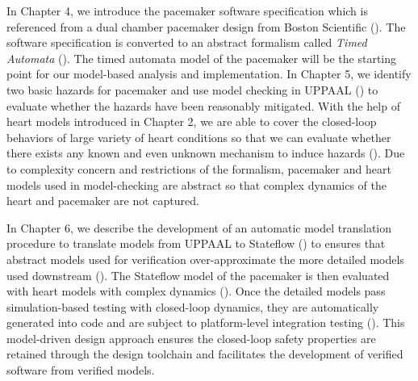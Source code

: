 In Chapter 4, we introduce the pacemaker software specification which is referenced from a dual chamber pacemaker design from Boston Scientific (\cite{compass}). The software specification is converted to an abstract formalism called \emph{Timed Automata} (\cite{timed_automata}). The timed automata model of the pacemaker will be the starting point for our model-based analysis and implementation. In Chapter 5, we identify two basic hazards for pacemaker and use model checking in UPPAAL (\cite{uppaal}) to evaluate whether the hazards have been reasonably mitigated. With the help of heart models introduced in Chapter 2, we are able to cover the closed-loop behaviors of large variety of heart conditions so that we can evaluate whether there exists any known and even unknown mechanism to induce hazards (\cite{STTT13}). Due to complexity concern and restrictions of the formalism, pacemaker and heart models used in model-checking are abstract so that complex dynamics of the heart and pacemaker are not captured. 

In Chapter 6, we describe the development of an automatic model translation procedure to translate models from UPPAAL to Stateflow (\cite{stateflow}) to ensures that abstract models used for verification over-approximate the more detailed models used downstream (\cite{RTAS12}). The Stateflow model of the pacemaker is then evaluated with heart models with complex dynamics (\cite{vhm_ecrts10, vhm_embc11,vhm_iccps11}). Once the detailed models pass simulation-based testing with closed-loop dynamics, they are automatically generated into code and are subject to platform-level integration testing (\cite{vhm_website}). This model-driven design approach ensures the closed-loop safety properties are retained through the design toolchain and facilitates the development of verified software from verified models.



